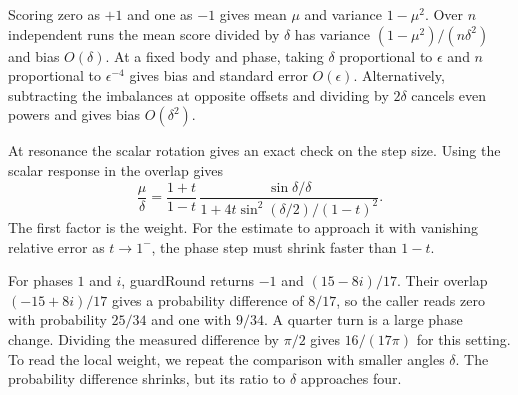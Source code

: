 \documentclass[acmsmall,screen,review,anonymous,nonacm]{acmart}
\newcommand{\storyinlineface}{\small\ttfamily}
\newcommand{\code}[1]{\textnormal{\storyinlineface #1}}
\numberwithin{equation}{section}
\begin{document}
Scoring zero as $+1$ and one as $-1$ gives mean $\mu$ and variance $1-\mu^2$.
Over $n$ independent runs the mean score divided by $\delta$ has variance
$(1-\mu^2)/(n\delta^2)$ and bias $O(\delta)$. At a fixed body and phase, taking $\delta$ proportional to $\epsilon$ and $n$ proportional to $\epsilon^{-4}$ gives bias and standard error $O(\epsilon)$.
Alternatively, subtracting the imbalances at opposite offsets and dividing by $2\delta$ cancels even powers and gives bias $O(\delta^2)$.

At resonance the scalar rotation gives an exact check on the step size. Using the scalar response in the overlap gives
\[
 \frac{\mu}{\delta}=\frac{1+t}{1-t}\,
 \frac{\sin\delta/\delta}{1+4t\sin^2(\delta/2)/(1-t)^2}.
\]
The first factor is the weight. For the estimate to approach it with vanishing relative error as $t\to1^-$, the phase step must shrink faster than $1-t$.

For phases $1$ and $i$, \code{guardRound} returns $-1$ and $(15-8i)/17$.
Their overlap $(-15+8i)/17$ gives a probability difference of $8/17$,
so the caller reads zero with probability $25/34$ and one with $9/34$.
A quarter turn is a large phase change. Dividing the measured difference by $\pi/2$
gives $16/(17\pi)$ for this setting. To read the local weight, we repeat the comparison
with smaller angles $\delta$. The probability difference shrinks, but its ratio to $\delta$ approaches four.
\end{document}
